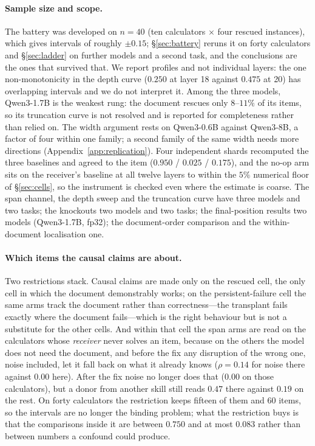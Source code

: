 \documentclass{article}
\begin{document}
\paragraph{Sample size and scope.} The battery was developed on $n=40$ (ten
calculators $\times$ four rescued instances), which gives intervals of roughly
$\pm 0.15$; \S\ref{sec:battery} reruns it on forty calculators and
\S\ref{sec:ladder} on further models and a second task, and the conclusions are
the ones that survived that. We report profiles and not individual layers: the one
non-monotonicity in the depth curve ($0.250$ at layer 18 against $0.475$ at 20)
has overlapping intervals and we do not interpret it. Among the three models,
Qwen3-1.7B is the weakest rung: the document rescues only $8$--$11\%$ of its
items, so its truncation curve is not resolved and is reported for completeness
rather than relied on. The width argument rests on Qwen3-0.6B against Qwen3-8B,
a factor of four within one family; a second family of the same width needs
more directions (Appendix~\ref{app:replication}).
Four independent shards recomputed the three baselines and agreed to the item
($0.950$ / $0.025$ / $0.175$), and the no-op arm sits on the receiver's baseline
at all twelve layers to within the $5\%$ numerical floor of
\S\ref{sec:cells}, so the instrument is checked even where the estimate is
coarse. The span channel, the depth sweep and the truncation curve have three
models and two tasks; the knockouts two models and two tasks; the final-position
results two models (Qwen3-1.7B, fp32); the document-order comparison and the
within-document localisation one.

\paragraph{Which items the causal claims are about.} Two restrictions stack.
Causal claims are made only on the rescued cell, the only cell in which the
document demonstrably works; on the persistent-failure cell the same arms track
the document rather than correctness---the transplant fails exactly where the
document fails---which is the right behaviour but is not a substitute for the
other cells. And within that cell the span arms are read on the calculators
whose \emph{receiver} never solves an item, because on the others the model does
not need the document, and before the fix any disruption of the wrong one,
noise included, let it fall back on what it already knows ($\rho = 0.14$ for
noise there against $0.00$ here). After the fix noise no longer does that
($0.00$ on those calculators), but a donor from another skill still reads $0.47$
there against $0.19$ on the rest. On forty calculators the restriction keeps fifteen of them and
$60$ items, so the intervals are no longer the binding problem; what the
restriction buys is that the comparisons inside it are between $0.750$ and
at most $0.083$ rather than between numbers a confound could produce.
\end{document}
